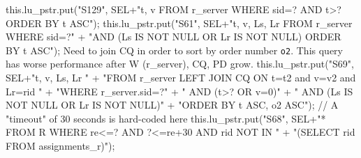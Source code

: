 \eatline
{}\nwendcode{}\endmoddef{}
this.lu_pstr.put("S129", SEL+"t, v FROM r_server WHERE sid=? AND t>? ORDER BY t ASC");
\eatline
{}\nwendcode{}\endmoddef{}
this.lu_pstr.put("S61", SEL+"t, v, Ls, Lr FROM r_server WHERE sid=?"
      + "AND (Ls IS NOT NULL OR Lr IS NOT NULL) ORDER BY t ASC");
\eatline
{}\nwendcode{}Need to join CQ in order to sort by order number {\tt{}o2}. This query has
worse performance after W (r\_server), CQ, PD grow.
\nwenddocs{}\endmoddef{}
this.lu_pstr.put("S69", SEL+"t, v, Ls, Lr "
      + "FROM r_server LEFT JOIN CQ ON t=t2 and v=v2 and Lr=rid "
      + "WHERE r_server.sid=?"
      + "   AND (t>? OR v=0)"
      + "   AND (Ls IS NOT NULL OR Lr IS NOT NULL)"
      + "ORDER BY t ASC, o2 ASC");
\eatline
{}\nwendcode{}\endmoddef{}
// A "timeout" of 30 seconds is hard-coded here
this.lu_pstr.put("S68", SEL+"* FROM R WHERE re<=? AND ?<=re+30 AND rid NOT IN  "
      + "(SELECT rid FROM assignments_r)");
\eatline
{}\nwendcode{}\endmoddef{}
